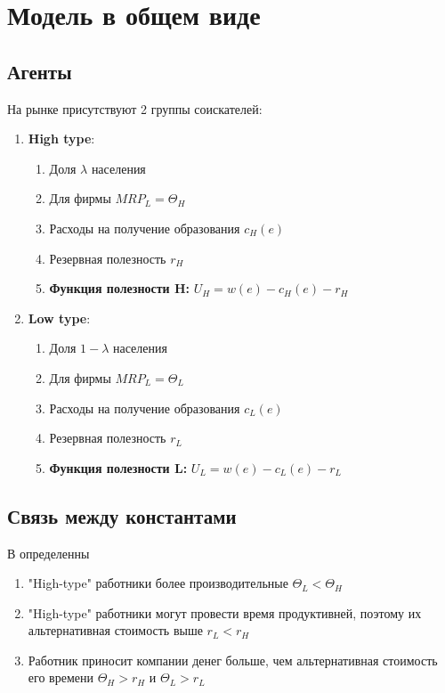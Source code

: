 \section{Модель в общем виде}
\subsection{Агенты}
\indent\setlength{\parindent}{1em}На рынке присутствуют 2 группы соискателей:
\begin{enumerate}
    \item \textbf{High type}: \begin{enumerate}
            \item Доля $\lambda$ населения
            \item Для фирмы $MRP_L=\Theta_H$
            \item Расходы на получение образования $c_H(e)$
            \item Резервная полезность $r_H$
            \item \textbf{Функция полезности H:} $U_H=w(e)-c_H(e)-r_H$
        \end{enumerate}
        \item \textbf{Low type}: \begin{enumerate}
            \item Доля $1-\lambda$ населения
            \item Для фирмы $MRP_L=\Theta_L$
            \item Расходы на получение образования $c_L(e)$
            \item Резервная полезность $r_L$
            \item \textbf{Функция полезности L:} $U_L=w(e)-c_L(e)-r_L$
        \end{enumerate}
\end{enumerate}
\subsection{Связь между константами}
\indent\setlength{\parindent}{1em}В определенны
\begin{enumerate}
    \item "High-type" работники более производительные $\Theta_L<\Theta_H$
    \item "High-type" работники могут провести время продуктивней, поэтому их альтернативная стоимость выше $r_L<r_H$
    \item Работник приносит компании денег больше, чем альтернативная стоимость его времени $\Theta_H>r_H$ и $\Theta_L>r_L$
\end{enumerate}
